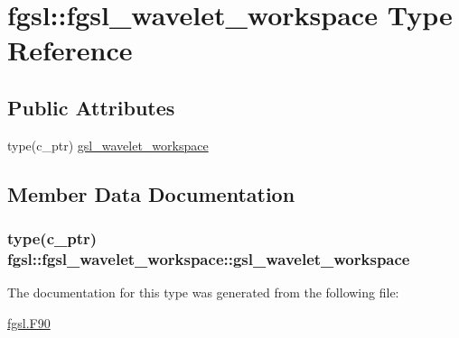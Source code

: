 \hypertarget{structfgsl_1_1fgsl__wavelet__workspace}{}\section{fgsl\+:\+:fgsl\+\_\+wavelet\+\_\+workspace Type Reference}
\label{structfgsl_1_1fgsl__wavelet__workspace}
\subsection*{Public Attributes}
\begin{DoxyCompactItemize}
\item 
type(c\+\_\+ptr) \hyperlink{structfgsl_1_1fgsl__wavelet__workspace_ae698b882f223dc47c238e1930e55a748}{gsl\+\_\+wavelet\+\_\+workspace}
\end{DoxyCompactItemize}


\subsection{Member Data Documentation}
\hypertarget{structfgsl_1_1fgsl__wavelet__workspace_ae698b882f223dc47c238e1930e55a748}{}
\subsubsection[{gsl\+\_\+wavelet\+\_\+workspace}]{\setlength{\rightskip}{0pt plus 5cm}type(c\+\_\+ptr) fgsl\+::fgsl\+\_\+wavelet\+\_\+workspace\+::gsl\+\_\+wavelet\+\_\+workspace}\label{structfgsl_1_1fgsl__wavelet__workspace_ae698b882f223dc47c238e1930e55a748}


The documentation for this type was generated from the following file\+:\begin{DoxyCompactItemize}
\item 
\hyperlink{fgsl_8F90}{fgsl.\+F90}\end{DoxyCompactItemize}
